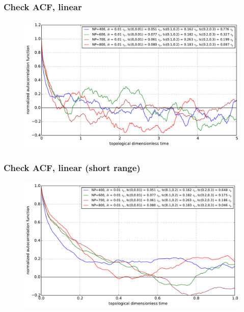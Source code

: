 \documentclass[slidestop, compress, mathserif]{beamer}
\begin{document}
\begin{frame}
  \frametitle<presentation>{Check ACF, linear}
  \begin{figure}
    \centering
    \includegraphics[width=\textwidth]{../check_ACF_initial.pdf}
  \end{figure}
\end{frame}

\begin{frame}
  \frametitle<presentation>{Check ACF, linear (short range)}
  \begin{figure}
    \centering
    \includegraphics[width=\textwidth]{../check_ACF_initial_detail.pdf}
  \end{figure}
\end{frame}
\end{document}
